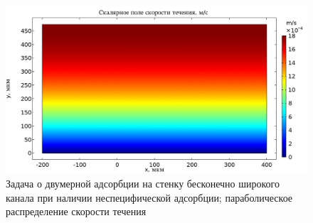\documentclass[oneside,final,12pt]{extreport}
\begin{document}
\begin{figure}
  \centering
  \includegraphics[width=.6\textwidth]{pic/flat_wide_twosurf_veldistrib}

  \caption{%
    \label{fig:flat_wide_two_surf_veldistrib}%
    Задача о двумерной адсорбции на стенку бесконечно широкого канала
    при наличии неспецифической адсорбции;
    параболическое распределение скорости течения
  }

\end{figure}
\end{document}

